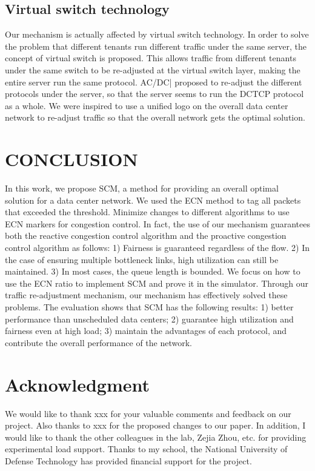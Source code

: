 \documentclass[conference]{IEEEtran}
\begin{document}
\subsection{Virtual switch technology}Our mechanism is actually affected by virtual switch technology. In order to solve the problem that different tenants run different traffic under the same server, the concept of virtual switch is proposed. This allows traffic from different tenants under the same switch to be re-adjusted at the virtual switch layer, making the entire server run the same protocol. AC/DC\cite{}| proposed to re-adjust the different protocols under the server, so that the server seems to run the DCTCP protocol as a whole. We were inspired to use a unified logo on the overall data center network to re-adjust traffic so that the overall network gets the optimal solution.
\section{CONCLUSION}
In this work, we propose SCM, a method for providing an overall optimal solution for a data center network. We used the ECN method to tag all packets that exceeded the threshold. Minimize changes to different algorithms to use ECN markers for congestion control. In fact, the use of our mechanism guarantees both the reactive congestion control algorithm and the proactive congestion control algorithm as follows: 1) Fairness is guaranteed regardless of the flow. 2) In the case of ensuring multiple bottleneck links, high utilization can still be maintained. 3) In most cases, the queue length is bounded. We focus on how to use the ECN ratio to implement SCM and prove it in the simulator. Through our traffic re-adjustment mechanism, our mechanism has effectively solved these problems. The evaluation shows that SCM has the following results: 1) better performance than unscheduled data centers; 2) guarantee high utilization and fairness even at high load; 3) maintain the advantages of each protocol, and contribute the overall performance of the network.
\section*{Acknowledgment}

We would like to thank xxx for your valuable comments and feedback on our project. Also thanks to xxx for the proposed changes to our paper. In addition, I would like to thank the other colleagues in the lab, Zejia Zhou, etc. for providing experimental load support. Thanks to my school, the National University of Defense Technology has provided financial support for the project.
\end{document}
